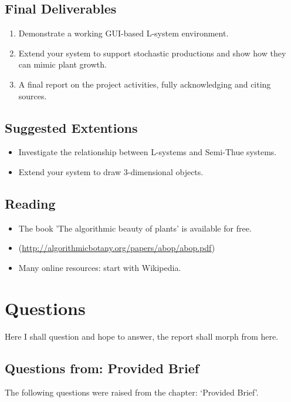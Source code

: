\documentclass[11pt]{report}
\begin{document}
\section{Final Deliverables}
\begin{enumerate}
    \item Demonstrate a working GUI-based L-system environment.
    \item Extend your system to support stochastic productions and show how they can
          mimic plant growth.
    \item A final report on the project activities, fully acknowledging and citing
          sources.
\end{enumerate}

\section{Suggested Extentions}
\begin{itemize}
    \item Investigate the relationship between L-systems and Semi-Thue systems.
    \item Extend your system to draw 3-dimensional objects.
\end{itemize}

\section{Reading}
\begin{itemize}
    \item The book 'The algorithmic beauty of plants' is available for free.
    \item (\url{http://algorithmicbotany.org/papers/abop/abop.pdf})
    \item Many online resources: start with Wikipedia.
\end{itemize}

\cite{example-cite}

\chapter{Questions}
Here I shall question and hope to answer, the report shall morph from here.

\section{Questions from: Provided Brief}
The following questions were raised from the chapter: `Provided Brief'.

\clearpage
\printbibliography
\end{document}
